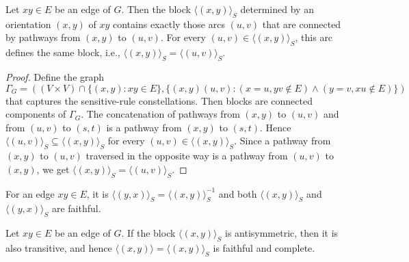 \begin{prop}
	Let $xy \in E$ be an edge of $G$. Then the block $\langle(x, y)\rangle_S$ determined by an orientation $(x, y)$ of $xy$ contains exactly those arcs $(u, v)$ that are connected by pathways from $(x, y)$ to $(u, v)$. For every $(u, v) \in \langle(x, y)\rangle_S$, this arc defines the same block, i.e., $\langle(x, y)\rangle_S = \langle(u, v)\rangle_S$.
\end{prop}

\begin{proof}
	Define the graph $\Gamma_G = ((V \times V ) \cap \{(x, y) : xy \in E\}, \{(x, y)(u, v) : (x = u, yv \notin E) \land (y = v, xu \notin E)\})$ that captures the sensitive-rule constellations. Then blocks are connected components	of $\Gamma_G$. The concatenation of pathways from $(x, y)$ to $(u, v)$ and from $(u, v)$ to $(s, t)$ is a pathway from $(x, y)$ to $(s, t)$. Hence $\langle(u, v)\rangle_S \subseteq \langle(x, y)\rangle_S$ for every $(u, v) \in \langle(x, y)\rangle_S$. Since a pathway from $(x, y)$ to $(u, v)$ traversed in the opposite way is a pathway from $(u, v)$ to $(x, y)$, we get $\langle(x, y)\rangle_S = \langle(u, v)\rangle_S$.
\end{proof}

\begin{cor}
	For an edge $xy \in E$, it is $\langle(y, x)\rangle_S = \langle(x, y)\rangle_{S}^{-1}$ and both $\langle(x, y)\rangle_S$ and $\langle(y, x)\rangle_S$ are faithful.
\end{cor}

\begin{lemma}
	Let $xy \in E$ be an edge of $G$. If the block $\langle(x, y)\rangle_S$ is antisymmetric, then it is also transitive, and hence $\langle(x, y)\rangle = \langle(x, y)\rangle_S$ is faithful and complete.
	\label{lemma-2}
\end{lemma}

